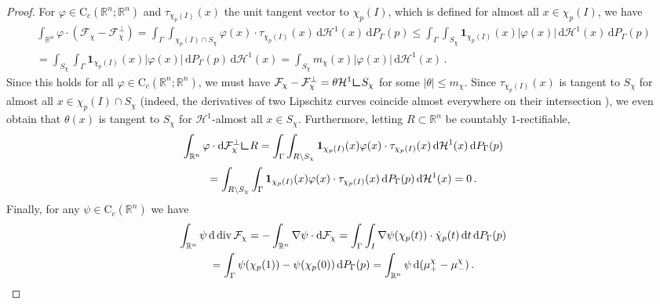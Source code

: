 \documentclass[10pt,a4paper,oneside,final]{article}
\newcommand{\R}{{\mathbb{R}}}
\newcommand{\de}{{\mathrm{d}}}
\DeclareMathOperator{\dv}{div}
\newcommand{\setchar}[1]{\mathbf{1}_{#1}}
\newcommand{\hdone}{\mathcal{H}^1}
\newcommand{\restr}{{\mbox{\LARGE$\llcorner$}}}
\newcommand{\cont}{{\mathrm{C}}}
\newcommand{\flux}{{\mathcal{F}}}
\newcommand{\reSpace}{\Gamma}
\newcommand{\reMeasure}{P_{\reSpace}}
\numberwithin{equation}{section}
\theoremstyle{plain}
\theoremstyle{definition}
\theoremstyle{remark}
\newcommand{\notinclude}[1]{}
\begin{document}
\begin{proof}
For $\varphi\in \cont_c(\R^n;\R^n)$ and $\tau_{\chi_p(I)}(x)$ the unit tangent vector to $\chi_p(I)$, which is defined for almost all $x\in\chi_p(I)$, we have
\begin{multline*}
\int_{\R^n}\varphi\cdot(\flux_\chi-\flux_\chi^\perp)
=\int_\reSpace\int_{\chi_p(I)\cap S_\chi}\varphi(x)\cdot\tau_{\chi_p(I)}(x)\,\de\hdone(x)\,\de \reMeasure(p)
\leq\int_\reSpace\int_{S_\chi}\setchar{\chi_p(I)}(x)|\varphi(x)|\,\de\hdone(x)\,\de \reMeasure(p)\\
=\int_{S_\chi}\int_\reSpace\setchar{\chi_p(I)}(x)|\varphi(x)|\,\de \reMeasure(p)\,\de\hdone(x)
=\int_{S_\chi}m_\chi(x)|\varphi(x)|\,\de\hdone(x)\,.
\end{multline*}
Since this holds for all $\varphi\in \cont_c(\R^n;\R^n)$, we must have $\flux_\chi-\flux_\chi^\perp=\theta\hdone\restr S_\chi$ for some $|\theta|\leq m_\chi$.
Since $\tau_{\chi_p(I)}(x)$ is tangent to $S_\chi$ for almost all $x\in\chi_p(I)\cap S_\chi$
(indeed, the derivatives of two Lipschitz curves coincide almost everywhere on their intersection%
\notinclude{: Let $D$ be the intersection points at which both curves are differentiable; only countably many points $x\in D$ can be isolated; the rest has coinciding derivative, which can be computed by the limit of the finite difference taken in $D$.}),
we even obtain that $\theta(x)$ is tangent to $S_\chi$ for $\hdone$-almost all $x\in S_\chi$.
Furthermore, letting $R\subset\R^n$ be countably $1$-rectifiable,
\begin{multline*}
\int_{\R^n}\varphi\cdot\de\flux_\chi^\perp\restr R
=\int_\reSpace\int_{R\setminus S_\chi}\setchar{\chi_p(I)}(x)\varphi(x)\cdot\tau_{\chi_p(I)}(x)\,\de\hdone(x)\,\de\reMeasure(p)\\
=\int_{R\setminus S_\chi}\int_\reSpace\setchar{\chi_p(I)}(x)\varphi(x)\cdot\tau_{\chi_p(I)}(x)\,\de\reMeasure(p)\,\de\hdone(x)
=0\,.
\end{multline*}
Finally, for any $\psi\in\cont_c(\R^n)$ we have
\begin{multline*}
\int_{\R^n}\psi\,\de\dv\flux_\chi
=-\int_{\R^n}\nabla\psi\cdot\de\flux_\chi
=\int_\reSpace\int_I\nabla\psi(\chi_p(t))\cdot\dot\chi_p(t)\,\de t\,\de \reMeasure(p)\\
=\int_\reSpace\psi(\chi_p(1))-\psi(\chi_p(0))\,\de \reMeasure(p)
=\int_{\R^n}\psi\,\de(\mu_+^\chi-\mu_-^\chi)\,.\qedhere
\end{multline*}
\end{proof}
\end{document}
